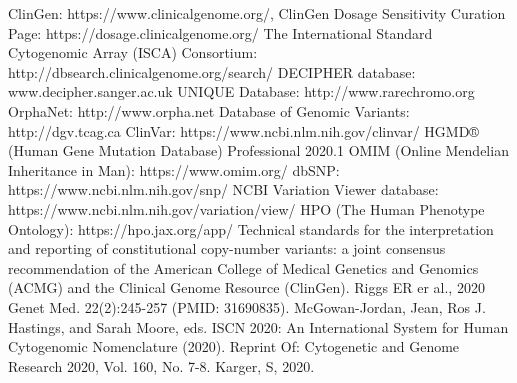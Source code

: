 \documentclass{article}
\begin{document}
\begin{thebibliography}{9}
        ClinGen: https://www.clinicalgenome.org/, ClinGen Dosage Sensitivity Curation Page: https://dosage.clinicalgenome.org/
        The International Standard Cytogenomic Array (ISCA) Consortium: http://dbsearch.clinicalgenome.org/search/
        DECIPHER database: www.decipher.sanger.ac.uk
        UNIQUE Database: http://www.rarechromo.org
        OrphaNet: http://www.orpha.net
        Database of Genomic Variants: http://dgv.tcag.ca
        ClinVar: https://www.ncbi.nlm.nih.gov/clinvar/
        HGMD® (Human Gene Mutation Database) Professional 2020.1
        OMIM (Online Mendelian Inheritance in Man): https://www.omim.org/
        dbSNP: https://www.ncbi.nlm.nih.gov/snp/
        NCBI Variation Viewer database: https://www.ncbi.nlm.nih.gov/variation/view/
        HPO (The Human Phenotype Ontology): https://hpo.jax.org/app/
        Technical standards for the interpretation and reporting of constitutional copy-number variants: a joint consensus recommendation of the American College of Medical Genetics and Genomics (ACMG) and the Clinical Genome Resource (ClinGen). Riggs ER er al., 2020 Genet Med. 22(2):245-257 (PMID: 31690835).
        McGowan-Jordan, Jean, Ros J. Hastings, and Sarah Moore, eds. ISCN 2020: An International System for Human Cytogenomic Nomenclature (2020). Reprint Of: Cytogenetic and Genome Research 2020, Vol. 160, No. 7-8. Karger, S, 2020.
\end{thebibliography}
\end{document}
